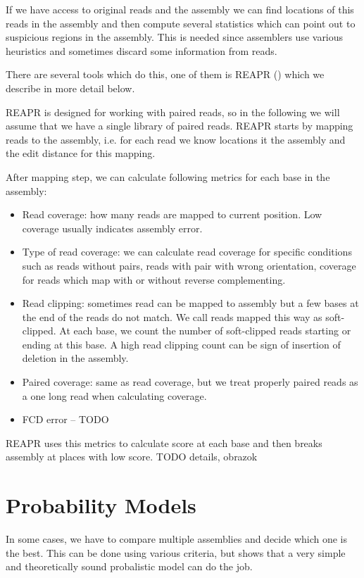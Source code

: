 If we have access to original reads and the assembly we can find locations
of this reads in the assembly and then compute several statistics which
can point out to suspicious regions in the assembly.
This is needed since assemblers use various heuristics and sometimes discard
some information from reads. 

There are several tools which do this, one of them is REAPR (\cite{Reapr}) which we describe
in more detail below.

REAPR is designed for working with paired reads, so in the following we will assume that
we have a single library of paired reads.
REAPR starts by mapping reads to the assembly, i.e. for each read we know locations it the assembly
and the edit distance for this mapping.

After mapping step, we can calculate following metrics for each base in the assembly:
\begin{itemize}
\item Read coverage: how many reads are mapped to current position. Low coverage usually indicates assembly error.
\item Type of read coverage: we can calculate read coverage for specific conditions such as reads without pairs,
reads with pair with wrong orientation, coverage for reads which map with or without reverse complementing.
\item Read clipping: sometimes read can be mapped to assembly but a few bases at the end of the reads do not match.
We call reads mapped this way as soft-clipped.
At each base, we count the number of soft-clipped reads starting or ending at this base. A high read
clipping count can be sign of insertion of deletion in the assembly.
\item Paired coverage: same as read coverage, but we treat properly paired reads as a one long read when calculating coverage.
\item FCD error -- TODO
\end{itemize}

REAPR uses this metrics to calculate score at each base and then breaks assembly at places with low
score.
TODO details, obrazok

\section{Probability Models}
\label{sec:prob}
In some cases, we have to compare multiple assemblies and decide which one is
the best. This can be done using various criteria, but \cite{Ghodsi2013} shows
that a very simple and theoretically sound probalistic model can do the job.

